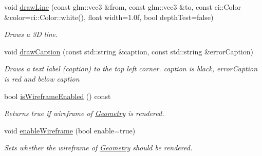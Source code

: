 \begin{DoxyCompactItemize}
\mbox{\label{classpepr3d_1_1_model_view_a55cdb6c309001e315259b9c2151ed571}} 
void \mbox{\hyperlink{classpepr3d_1_1_model_view_a55cdb6c309001e315259b9c2151ed571}{draw\+Line}} (const glm\+::vec3 \&from, const glm\+::vec3 \&to, const ci\+::\+Color \&color=ci\+::\+Color\+::white(), float width=1.\+0f, bool depth\+Test=false)
\begin{DoxyCompactList}\small\item\em Draws a 3D line. \end{DoxyCompactList}\item 
\mbox{\label{classpepr3d_1_1_model_view_a338d7d487eaf95ca572a0ad63508d42f}} 
void \mbox{\hyperlink{classpepr3d_1_1_model_view_a338d7d487eaf95ca572a0ad63508d42f}{draw\+Caption}} (const std\+::string \&caption, const std\+::string \&error\+Caption)
\begin{DoxyCompactList}\small\item\em Draws a text label (caption) to the top left corner. {\ttfamily caption} is black, {\ttfamily error\+Caption} is red and below {\ttfamily caption} \end{DoxyCompactList}\item 
\mbox{\label{classpepr3d_1_1_model_view_af9463d814c0df630235f7f7ac212eb54}} 
bool \mbox{\hyperlink{classpepr3d_1_1_model_view_af9463d814c0df630235f7f7ac212eb54}{is\+Wireframe\+Enabled}} () const
\begin{DoxyCompactList}\small\item\em Returns true if wireframe of \mbox{\hyperlink{classpepr3d_1_1_geometry}{Geometry}} is rendered. \end{DoxyCompactList}\item 
\mbox{\label{classpepr3d_1_1_model_view_ad6af1ab71ae31eb1a1e9290a1e5e45e3}} 
void \mbox{\hyperlink{classpepr3d_1_1_model_view_ad6af1ab71ae31eb1a1e9290a1e5e45e3}{enable\+Wireframe}} (bool enable=true)
\begin{DoxyCompactList}\small\item\em Sets whether the wireframe of \mbox{\hyperlink{classpepr3d_1_1_geometry}{Geometry}} should be rendered. \end{DoxyCompactList}\item 
\mbox{\label{classpepr3d_1_1_model_view_af233e744e89acdc27258033377f9f14e}} 

\end{DoxyCompactItemize}
